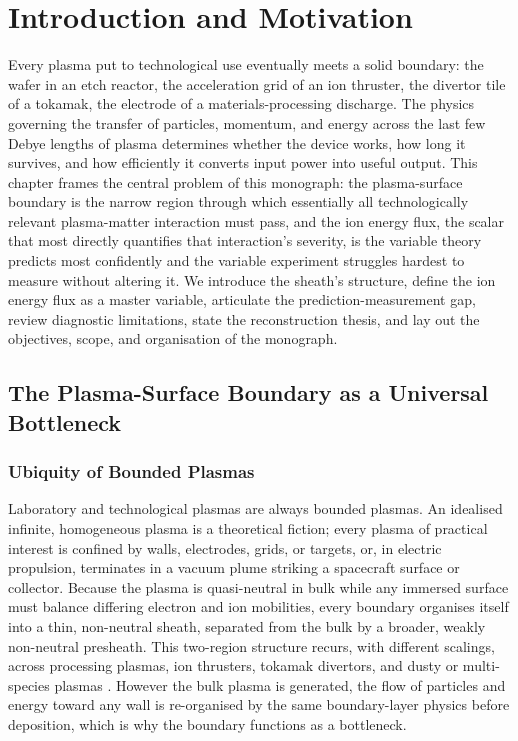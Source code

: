 \chapter{Introduction and Motivation}
\label{ch:intro}

Every plasma put to technological use eventually meets a solid boundary: the wafer in an etch reactor, the acceleration grid of an ion thruster, the divertor tile of a tokamak, the electrode of a materials-processing discharge. The physics governing the transfer of particles, momentum, and energy across the last few Debye lengths of plasma determines whether the device works, how long it survives, and how efficiently it converts input power into useful output. This chapter frames the central problem of this monograph: the plasma-surface boundary is the narrow region through which essentially all technologically relevant plasma-matter interaction must pass, and the ion energy flux, the scalar that most directly quantifies that interaction's severity, is the variable theory predicts most confidently and the variable experiment struggles hardest to measure without altering it. We introduce the sheath's structure, define the ion energy flux as a master variable, articulate the prediction-measurement gap, review diagnostic limitations, state the reconstruction thesis, and lay out the objectives, scope, and organisation of the monograph.

\section{The Plasma-Surface Boundary as a Universal Bottleneck}

\subsection{Ubiquity of Bounded Plasmas}

Laboratory and technological plasmas are always bounded plasmas. An idealised infinite, homogeneous plasma is a theoretical fiction; every plasma of practical interest is confined by walls, electrodes, grids, or targets, or, in electric propulsion, terminates in a vacuum plume striking a spacecraft surface or collector. Because the plasma is quasi-neutral in bulk while any immersed surface must balance differing electron and ion mobilities, every boundary organises itself into a thin, non-neutral sheath, separated from the bulk by a broader, weakly non-neutral presheath. This two-region structure recurs, with different scalings, across processing plasmas, ion thrusters, tokamak divertors, and dusty or multi-species plasmas \cite{ref0013}. However the bulk plasma is generated, the flow of particles and energy toward any wall is re-organised by the same boundary-layer physics before deposition, which is why the boundary functions as a bottleneck.

